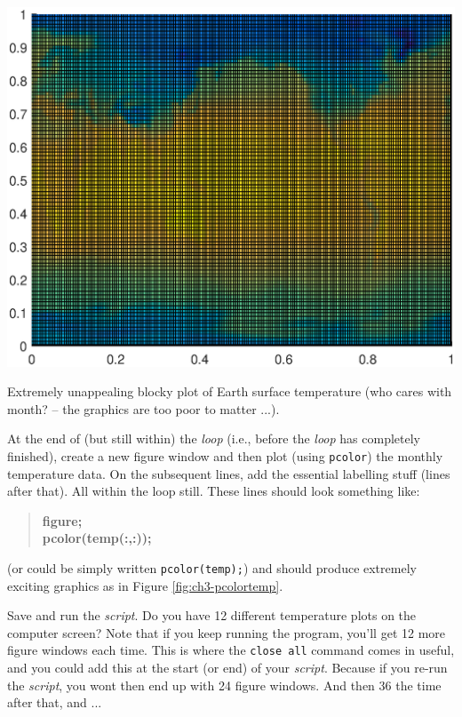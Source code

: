 \documentclass{tufte-book} %
\newenvironment{docspecbold}{\begin{quotation}\ttfamily\bfseries\parskip0pt\parindent0pt\ignorespaces}{\end{quotation}}
\begin{document}
\begin{marginfigure}[-0.0in]
\includegraphics[width=\linewidth]{ch3-pcolortemp.eps}
\caption{Extremely unappealing blocky plot of Earth surface temperature (who cares with month? -- the graphics are too poor to matter ...).}
\label{fig:ch3-pcolortemp}
\end{marginfigure}

At the end of (but still within) the \textit{loop} (i.e., before the \textit{loop} has completely finished), create a new \textsf{figure window} and then plot (using \texttt{pcolor}) the monthly temperature data. On the subsequent lines, add the essential labelling stuff (lines after that). All within the loop still. These lines should look something like:

\begin{docspecbold}
figure;
\\pcolor(temp(:,:));
\end{docspecbold}

\noindent (or could be simply written \texttt{pcolor(temp);}) and should produce extremely exciting graphics as in Figure \ref{fig:ch3-pcolortemp}.

Save and run the \textit{script}. Do you have 12 different temperature plots on the computer screen? Note that if you keep running the program, you'll get 12 more figure windows each time. This is where the \texttt{close all} command comes in useful, and you could add this at the start (or end) of your \textit{script}. Because if you re-run the \textit{script}, you wont then end up with 24 figure windows. And then 36 the time after that, and ... 
\end{document}
